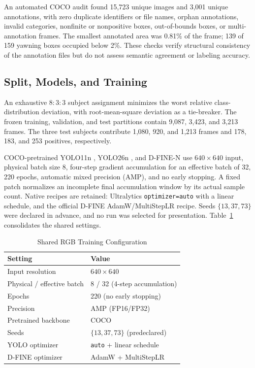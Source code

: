 \documentclass[conference]{IEEEtran}
\begin{document}
An automated COCO audit found 15,723 unique images and 3,001 unique annotations, with zero duplicate identifiers or file names, orphan annotations, invalid categories, nonfinite or nonpositive boxes, out-of-bounds boxes, or multi-annotation frames. The smallest annotated area was 0.81\% of the frame; 139 of 159 yawning boxes occupied below 2\%. These checks verify structural consistency of the annotation files but do not assess semantic agreement or labeling accuracy.

\subsection{Split, Models, and Training}
An exhaustive $8{:}3{:}3$ subject assignment minimizes the worst relative class-distribution deviation, with root-mean-square deviation as a tie-breaker. The frozen training, validation, and test partitions contain 9,087, 3,423, and 3,213 frames. The three test subjects contribute 1,080, 920, and 1,213 frames and 178, 183, and 253 positives, respectively.

COCO-pretrained YOLO11n \cite{ultralytics2024yolo11}, YOLO26n \cite{ultralytics2026}, and D-FINE-N \cite{peng2025dfine} use $640\times640$ input, physical batch size 8, four-step gradient accumulation for an effective batch of 32, 220 epochs, automatic mixed precision (AMP), and no early stopping. A fixed patch normalizes an incomplete final accumulation window by its actual sample count. Native recipes are retained: Ultralytics \texttt{optimizer=auto} with a linear schedule, and the official D-FINE AdamW/MultiStepLR recipe. Seeds $\{13,37,73\}$ were declared in advance, and no run was selected for presentation. Table~\ref{tab:settings} consolidates the shared settings.

\begin{table}[t]
\caption{Shared RGB Training Configuration}
\label{tab:settings}
\centering
\setlength{\tabcolsep}{3.6pt}
\scriptsize
\begin{tabular}{ll}
\toprule
Setting & Value \\
\midrule
Input resolution & $640\times640$ \\
Physical / effective batch & 8 / 32 (4-step accumulation) \\
Epochs & 220 (no early stopping) \\
Precision & AMP (FP16/FP32) \\
Pretrained backbone & COCO \\
Seeds & $\{13, 37, 73\}$ (predeclared) \\
YOLO optimizer & \texttt{auto} + linear schedule \\
D-FINE optimizer & AdamW + MultiStepLR \\
\bottomrule
\end{tabular}
\end{table}
\end{document}
